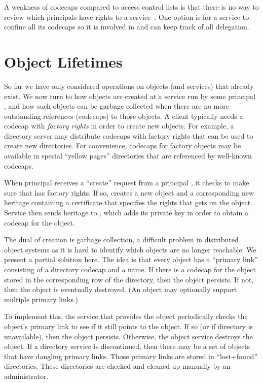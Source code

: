 \documentclass[10pt, conference, compsocconf]{IEEEtran}
\begin{document}
A weakness of codecaps compared to access control lists is that there is no
way to review which principals have rights to a service~\cite{Gli79}.
One option is for a service to confine all its codecaps so it is
involved in and can keep track of all delegation.

\section{Object Lifetimes}

So far we have only considered operations on objects (and services)
that already exist.
We now turn to how objects are created at a service run by some
principal , and
how such objects can be garbage collected when there are no more
outstanding references (codecaps) to those objects.
A client typically needs a codecap with \emph{factory rights}
in order to create new objects.  For example, a directory server
may distribute codecaps with factory rights that can be used
to create new directories.
For convenience, codecaps for factory objects may be available in special
``yellow pages'' directories that are referenced by well-known codecaps.

When principal  receives a ``create'' request from a principal ,
it checks to make sure that  has factory rights.  If so,  creates
a new object and a corresponding new heritage  containing a
certificate  that specifies the rights that  gets on the object.
Service  then sends heritage  to , which adds its private
key in order to obtain a codecap  for the object.

The dual of creation is garbage collection, a difficult problem in
distributed object systems as it is hard to identify which objects are
no longer reachable.
We present a partial solution here.  The idea is that
every object has a ``primary link'' consisting of a directory codecap and
a name.  If there is a codecap for the object stored in the corresponding row
of the directory, then the object persists.
If not, then the object is eventually destroyed.
(An object may optionally support multiple primary links.)

To implement this, the service that provides the object periodically
checks the object's primary link to see if it still points to the object.
If so (or if directory is unavailable), then the object persists.
Otherwise, the object service destroys the object.
If a directory service is discontinued, then there may be a set of
objects that have dangling primary links.  Those primary links are
stored in ``lost+found'' directories.
These directories are
checked and cleaned up manually by an administrator.
\end{document}
